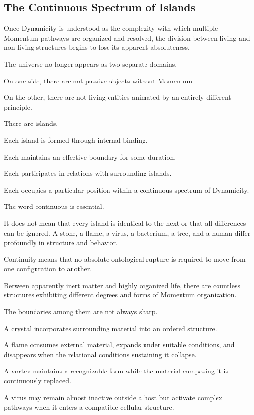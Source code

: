 \subsection*{\textbf{The Continuous Spectrum of Islands}} 


Once Dynamicity is understood as the complexity with which multiple Momentum pathways are organized and resolved, the division between living and non-living structures begins to lose its apparent absoluteness.

The universe no longer appears as two separate domains.

On one side, there are not passive objects without Momentum.

On the other, there are not living entities animated by an entirely different principle.

There are islands.

Each island is formed through internal binding.

Each maintains an effective boundary for some duration.

Each participates in relations with surrounding islands.

Each occupies a particular position within a continuous spectrum of Dynamicity.

The word continuous is essential.

It does not mean that every island is identical to the next or that all differences can be ignored. A stone, a flame, a virus, a bacterium, a tree, and a human differ profoundly in structure and behavior.

Continuity means that no absolute ontological rupture is required to move from one configuration to another.

Between apparently inert matter and highly organized life, there are countless structures exhibiting different degrees and forms of Momentum organization.

The boundaries among them are not always sharp.

A crystal incorporates surrounding material into an ordered structure.

A flame consumes external material, expands under suitable conditions, and disappears when the relational conditions sustaining it collapse.

A vortex maintains a recognizable form while the material composing it is continuously replaced.

A virus may remain almost inactive outside a host but activate complex pathways when it enters a compatible cellular structure.

